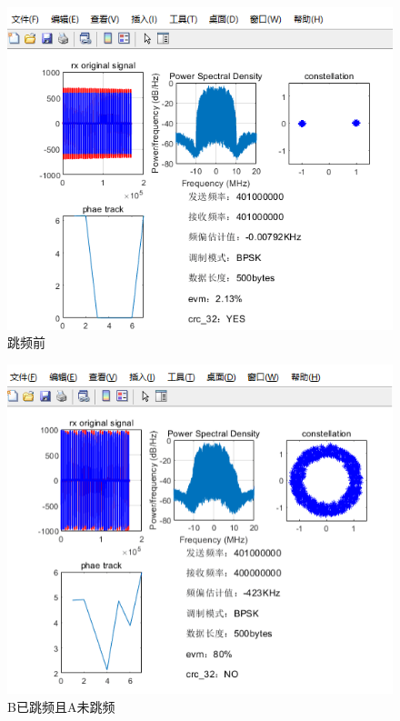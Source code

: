 \documentclass[12pt]{ctexart}
\begin{document}
\begin{figure}[htbp]
	\centering
 	\includegraphics[scale=0.6]{../figures/hop-a0b0.png}
	\caption{跳频前}
	\label{hop-a0b0}
\end{figure}

\begin{figure}[htbp]
	\centering
 	\includegraphics[scale=0.6]{../figures/hop-a0b1.png}
	\caption{B已跳频且A未跳频}
	\label{hop-a0b1}
\end{figure}
\end{document}
